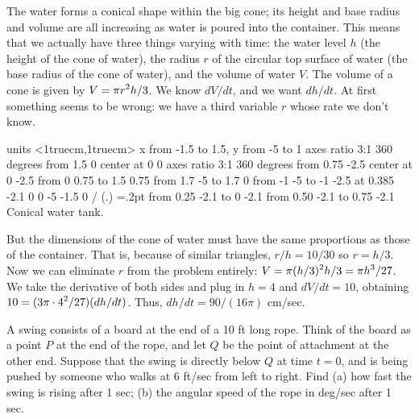 The water forms a conical shape within the big cone; its
height and base radius and volume are all increasing
as water is poured into the container.  This means that we actually have
three things varying with time: the water level $h$ (the height of the cone
of water), the radius $r$ of the circular top surface of water (the base
radius of the cone of water), and the volume of water $V$.  
The volume of a cone is given by
$\displaystyle V=\pi r^2h/3$.  We know $dV/dt$, and we want $dh/dt$.  At
first something seems to be wrong: we have a third variable $r$ whose rate
we don't know.  

\figure
\texonly
\vbox{\beginpicture
\normalgraphs
\sevenpoint
\setcoordinatesystem units <1truecm,1truecm>
\setplotarea x from -1.5 to 1.5, y from -5 to 1
\ellipticalarc  axes ratio 3:1  360 degrees from 1.5 0 center at 0 0
\ellipticalarc  axes ratio 3:1  360 degrees from 0.75 -2.5 center at 0 -2.5
 from 0 0.75 to 1.5 0.75
 from 1.7 -5 to 1.7 0
 from -1 -5 to -1 -2.5
 at 0.385 -2.1
\setlinear
{} 0 0 -5 -1.5 0 /
\setplotsymbol ({\teeny.})
\plotsymbolspacing=.2pt
\arrow <2pt> [0.7, 2] from 0.25 -2.1 to 0 -2.1
\arrow <2pt> [0.7, 2] from 0.50 -2.1 to 0.75 -2.1
\endpicture}
\endtexonly
{}
\begincaption
Conical water tank.
\endcaption
\endfigure

But the dimensions of the cone of water must have the same
proportions as those of the container.  
That is, because of similar triangles, 
$r/h=10/30$ so $r=h/3$.  Now we can eliminate $r$ from the
problem entirely: $\displaystyle V=\pi(h/3)^2h/3=\pi h^3/27$.  We take
the derivative of both sides and plug in $h=4$ and $dV/dt=10$, obtaining
$\displaystyle 10=(3\pi\cdot 4^2/27)(dh/dt)$.  Thus, $dh/dt=90/(16\pi)$
cm/sec.
\endexample

\example
A swing consists of a board at the end of a 10 ft long rope.  Think of the
board as a point $P$ at the end of the rope, and let $Q$ be the point of
attachment at the other end.  Suppose that the swing is directly below $Q$
at time $t=0$, and is being pushed by someone who walks at 6
ft/sec from left to right.  Find (a) how fast the swing is rising after 1
sec; (b) the angular speed of the rope in deg/sec after 1 sec.

